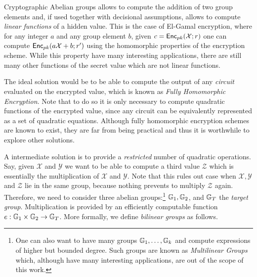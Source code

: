 Cryptographic Abelian groups allows to compute the addition of two group elements and, if used together with decisional assumptions, allows to compute \emph{linear functions} of a hidden value. This is the case of El-Gamal encryption, where for any integer $a$ and any group element $b$, given $c=\mathsf{Enc}_{pk}(\mathcal{X};r)$ one can compute $\mathsf{Enc}_{pk}(a\mathcal{X}+b;r')$ using the homomorphic properties of the encryption scheme.
While this property have many interesting applications, there are still many other functions of the secret value which are not linear functions.

The ideal solution would be to be able to compute the output of any \emph{circuit} evaluated on the encrypted value, which is known as \emph{Fully Homomorphic Encryption}. Note that to do so it is only necessary to compute quadratic functions of the encrypted value, since any circuit can be equivalently represented as a set of quadratic equations. Although fully homomorphic encryption schemes are known to exist, they are far from being practical and thus it is worthwhile to explore other solutions. 

A intermediate solution is to provide a \emph{restricted} number of quadratic operations. Say, given $\mathcal{X}$ and $\mathcal{Y}$ we want to be able to compute a third value $\mathcal{Z}$ which is essentially the multiplication of $\mathcal{X}$ and $\mathcal{Y}$. Note that this rules out case when $\mathcal{X},\mathcal{Y}$ and $\mathcal{Z}$ lie in the same group, because nothing prevents to multiply $\mathcal{Z}$ again. Therefore, we need to consider three abelian groups:\footnote{One can also want to have many groups $\mathbb{G}_1,\ldots,\mathbb{G}_k$ and compute expressions of higher but bounded degree. Such groups are known as \emph{Multilinear Groups} which, although have many interesting applications, are out of the scope of this work.} $\mathbb{G}_1,\mathbb{G}_2$, and $\mathbb{G}_T$ the \emph{target group}. Multiplication is provided by an efficiently computable function $e:\mathbb{G}_1\times\mathbb{G}_2\to\mathbb{G}_T$. More formally, we define \emph{bilinear groups} as follows.

